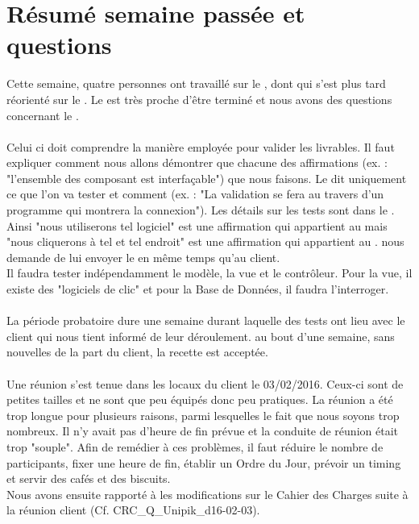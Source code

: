 \documentclass [a4paper] {article}
\begin{document}
\section{Résumé semaine passée et questions}
Cette semaine, quatre personnes ont travaillé sur le \DSE{}, dont \Michel{} qui s'est plus tard réorienté sur le \PTV{}. Le \DSECourt{} est très proche d'être terminé et nous avons des questions concernant le \PTVCourt{}.
\paragraph{}
Celui ci doit comprendre la manière employée pour valider les livrables. Il faut expliquer comment nous allons démontrer que chacune des affirmations (ex. : "l'ensemble des composant est interfaçable") que nous faisons. Le \PTVCourt{} dit uniquement ce que l'on va tester et comment (ex. : "La validation se fera au travers d'un programme qui montrera la connexion"). Les détails sur les tests sont dans le \CDR{}. Ainsi "nous utiliserons tel logiciel" est une affirmation qui appartient au \PTVCourt{} mais "nous cliquerons à tel et tel endroit" est une affirmation qui appartient au \CDR{}. \nomTuteurPedago{} nous demande de lui envoyer le \PTV{} en même temps qu'au client.
\\
Il faudra tester indépendamment le modèle, la vue et le contrôleur. Pour la vue, il existe des "logiciels de clic" et pour la Base de Données, il faudra l'interroger.
\paragraph{}
La période probatoire dure une semaine durant laquelle des tests ont lieu avec le client qui nous tient informé de leur déroulement. au bout d'une semaine, sans nouvelles de la part du client, la recette est acceptée.
\paragraph{}
Une réunion s'est tenue dans les locaux du client le 03/02/2016. Ceux-ci sont de petites tailles et ne sont que peu équipés donc peu pratiques. La réunion a été trop longue pour plusieurs raisons, parmi lesquelles le fait que nous soyons trop nombreux. Il n'y avait pas d'heure de fin prévue et la conduite de réunion était trop "souple". Afin de remédier à ces problèmes, il faut réduire le nombre de participants, fixer une heure de fin, établir un Ordre du Jour, prévoir un timing et servir des cafés et des biscuits.
\\
Nous avons ensuite rapporté à \nomTuteurPedago{} les modifications sur le Cahier des Charges suite à la réunion client (Cf. CRC\_Q\_Unipik\_d16-02-03).
\end{document}
